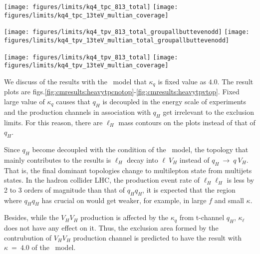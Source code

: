 \begin{figure*}
\centering
\texttt{[image: figures/limits/kq4\_tpc\_813\_total]} 
\texttt{[image: figures/limits/kq4\_tpc\_13teV\_multian\_coverage]}
\caption{Results for scenario (\emph{Heavy $q_H$})$\times$(\emph{Light $T^\pm$})$\times$(\emph{TPC})}
\label{fig:cmresults:heavytpctop}
\end{figure*}

\begin{figure*}
\texttt{[image: figures/limits/kq4\_tpv\_813\_total\_groupallbuttevenodd]} 
\texttt{[image: figures/limits/kq4\_tpv\_13teV\_multian\_total\_groupallbuttevenodd]}
\caption{Results for scenario (\emph{Heavy $q_H$})$\times$(\emph{Heavy $T^\pm$})$\times$(\emph{TPV})}
\label{fig:cmresults:heavytpvnotop}
\end{figure*}

\begin{figure*}
\centering
\texttt{[image: figures/limits/kq4\_tpv\_813\_total]} 
\texttt{[image: figures/limits/kq4\_tpv\_13teV\_multian\_coverage]}
\caption{Results for scenario (\emph{Heavy $q_H$})$\times$(\emph{Light $T^\pm$})$\times$(\emph{TPV})}
\label{fig:cmresults:heavytpvtop}
\end{figure*}

We discuss of the results with the \hq~model that $\kappa_q$ is fixed value as $4.0$. 
The result plots are figs.\ref{fig:cmresults:heavytpcnotop}-\ref{fig:cmresults:heavytpvtop}. 
Fixed large value of $\kappa_q$ causes that $q_H$ is decoupled in the energy scale of experiments 
and the production channels in association with $q_H$ get irrelevant to the exclusion limits.
For this reason, there are $\ell_H$ mass contours on the plots instead of that of $q_H$. 

Since $q_H$ become decoupled with the condition of the \hq~model, the topology that mainly contributes to the results is $\ell_H$ decay into $\ell~V_H$ instead of $q_H~\to~q~V_H$. 
That is, the final dominant topologies change to multilepton state from multijets states. 
In the hadron collider LHC, the production event rate of $\ell_H \ell_H$ is less by 2 to 3 orders of magnitude than that of $q_H q_H$,
it is expected that the region where $q_H q_H$ has crucial on would get weaker, for example, in large $f$ 
and small $\kappa$.

Besides, while the $V_H V_H$ production is affected by the $\kappa_q$ from t-channel $q_H$, 
$\kappa_\ell$ does not have any effect on it. Thus, the exclusion area formed by the contrubution of $V_H V_H$ production channel is predicted to have the result 
with $\kappa~=~4.0$ of the \fu~model. 

